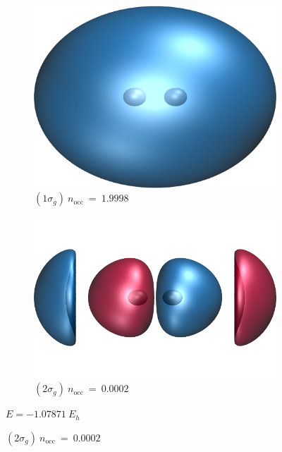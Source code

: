 \documentclass[aps,prb,reprint,showkeys,superscriptaddress]{revtex4-1}
\begin{document}
\begin{figure}
  \begin{subfigure}[l]{0.45\linewidth}
    \includegraphics[width=0.75\linewidth]{Figures/h2_HF_mo1.cube.png}
    \caption*{\centering $(1\sigma_g)~n_\text{occ}~=~1.9998$}
  \end{subfigure}
  \begin{subfigure}[r]{0.45\linewidth}
    \includegraphics[width=0.75\linewidth]{Figures/h2_HF_mo4.cube.png}
    \caption*{\centering $(2\sigma_g)~n_\text{occ}~=~0.0002$}
  \end{subfigure}
  $E=-1.07871~E_h$
  

\end{figure}
\end{document}
